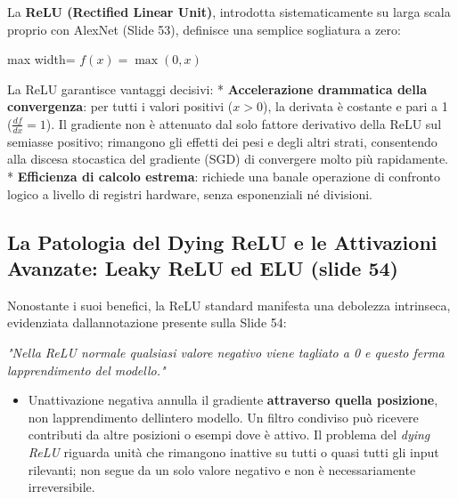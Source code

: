 \documentclass[11pt,a4paper,oneside,openany]{book}
\providecommand{\tightlist}{\setlength{\itemsep}{0pt}\setlength{\parskip}{0pt}}
\renewenvironment{quote}{\list{}{\leftmargin=1em\rightmargin=0pt}\item\relax}{\endlist}
\begin{document}
La \textbf{ReLU (Rectified Linear Unit)}, introdotta sistematicamente su larga scala proprio con AlexNet (Slide 53), definisce una semplice sogliatura a zero:

\begin{center}
\begin{adjustbox}{max width=\linewidth}
$\displaystyle 
\boxed{f(x) = \max(0, x)}
$
\end{adjustbox}
\end{center}

La ReLU garantisce vantaggi decisivi: * \textbf{Accelerazione drammatica della convergenza}: per tutti i valori positivi (\(x > 0\)), la derivata è costante e pari a 1 (\(\frac{df}{dx} = 1\)). Il gradiente non è attenuato dal solo fattore derivativo della ReLU sul semiasse positivo; rimangono gli effetti dei pesi e degli altri strati, consentendo alla discesa stocastica del gradiente (SGD) di convergere molto più rapidamente. * \textbf{Efficienza di calcolo estrema}: richiede una banale operazione di confronto logico a livello di registri hardware, senza esponenziali né divisioni.

\subsection{La Patologia del Dying ReLU e le Attivazioni Avanzate: Leaky ReLU ed ELU (slide 54)}\label{f02-r756}

Nonostante i suoi benefici, la ReLU standard manifesta una debolezza intrinseca, evidenziata dall\textquotesingle annotazione presente sulla Slide 54:

\begin{quote}
\emph{"Nella ReLU normale qualsiasi valore negativo viene tagliato a 0 e questo ferma l\textquotesingle apprendimento del modello."}
\end{quote}

\begin{itemize}
\tightlist
\item
  Un\textquotesingle attivazione negativa annulla il gradiente \textbf{attraverso quella posizione}, non l\textquotesingle apprendimento dell\textquotesingle intero modello. Un filtro condiviso può ricevere contributi da altre posizioni o esempi dove è attivo. Il problema del \emph{dying ReLU} riguarda unità che rimangono inattive su tutti o quasi tutti gli input rilevanti; non segue da un solo valore negativo e non è necessariamente irreversibile.
\end{itemize}
\end{document}
